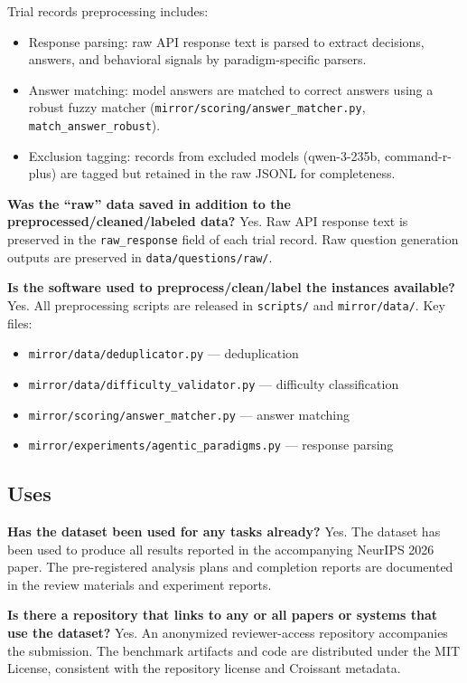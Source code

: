 Trial records preprocessing includes:
\begin{itemize}
  \item Response parsing: raw API response text is parsed to extract decisions,
    answers, and behavioral signals by paradigm-specific parsers.
  \item Answer matching: model answers are matched to correct answers using a robust
    fuzzy matcher (\texttt{mirror/scoring/answer\_matcher.py},
    \texttt{match\_answer\_robust}).
  \item Exclusion tagging: records from excluded models (qwen-3-235b, command-r-plus)
    are tagged but retained in the raw JSONL for completeness.
\end{itemize}

\textbf{Was the ``raw'' data saved in addition to the preprocessed/cleaned/labeled data?}
Yes. Raw API response text is preserved in the \texttt{raw\_response} field of each
trial record. Raw question generation outputs are preserved in
\texttt{data/questions/raw/}.

\textbf{Is the software used to preprocess/clean/label the instances available?}
Yes. All preprocessing scripts are released in \texttt{scripts/} and
\texttt{mirror/data/}. Key files:
\begin{itemize}
  \item \texttt{mirror/data/deduplicator.py} — deduplication
  \item \texttt{mirror/data/difficulty\_validator.py} — difficulty classification
  \item \texttt{mirror/scoring/answer\_matcher.py} — answer matching
  \item \texttt{mirror/experiments/agentic\_paradigms.py} — response parsing
\end{itemize}

\subsection*{Uses}

\textbf{Has the dataset been used for any tasks already?}
Yes. The dataset has been used to produce all results reported in the accompanying
NeurIPS 2026 paper. The pre-registered analysis plans and completion reports are
documented in the review materials and experiment reports.

\textbf{Is there a repository that links to any or all papers or systems that use the dataset?}
Yes. An anonymized reviewer-access repository accompanies the submission. The benchmark
artifacts and code are distributed under the MIT License, consistent with the
repository license and Croissant metadata.


